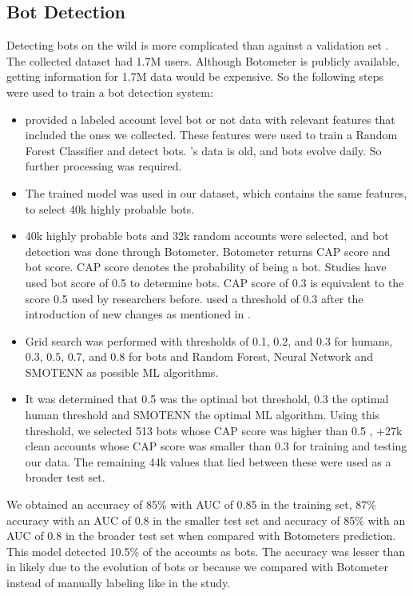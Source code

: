 \documentclass[letterpaper]{article}
\begin{document}
\subsection{Bot Detection}
Detecting bots on the wild is more complicated than against a validation set \cite{bovet2019influence,varol2017early,ferrara2016rise}. The collected dataset had 1.7M 
users. Although Botometer is publicly available, getting information for 1.7M data would be expensive. So the following steps were used to train a bot detection system:

\begin{itemize}
    \item \cite{cresci2017paradigm} provided a labeled account level bot or not data with relevant features that included the ones we collected.
    These features were used to train a Random Forest Classifier and detect bots. 
    \cite{cresci2017paradigm}'s data is old, and bots evolve daily. So further processing was required.
    \item The trained model was used in our dataset, which contains the same features, to select 40k highly probable bots.
    \item 40k highly probable bots and 32k random accounts were selected, and bot detection was done through Botometer. Botometer returns CAP score and bot score. CAP score denotes the probability of being a bot. 
    Studies have used bot score of 0.5 to determine bots. CAP score of 0.3 is equivalent to the score 0.5 used by researchers before. \cite{deb2019perils} used a threshold of 0.3 after the 
    introduction of new changes as mentioned in \cite{yang2019arming}.
    \item Grid search was performed with thresholds of 0.1, 0.2, and 0.3 for humans, 0.3, 0.5, 0.7, and 0.8 for bots and Random Forest, Neural Network and SMOTENN as possible ML algorithms.
    \item It was determined that 0.5 was the optimal bot threshold, 0.3 the optimal human threshold and SMOTENN the optimal ML algorithm. Using this threshold, we selected 513 bots whose CAP score was higher than 0.5 , 
    +27k clean accounts whose CAP score was smaller than 0.3 for training and testing our data. The remaining 44k values that lied between these were used as a broader test set.
\end{itemize}

We obtained an accuracy of 85\% with AUC of 0.85 in the training set, 87\% accuracy with 
an AUC of 0.8 in the smaller test set and accuracy of 85\% with an AUC of 0.8 in the broader test set when compared with Botometers prediction. This model detected 10.5\% of the accounts as 
bots. The accuracy was lesser than in \cite{kudugunta2018deep} likely due to the evolution of bots or because we compared with Botometer instead of manually labeling like in the study. 
\end{document}
